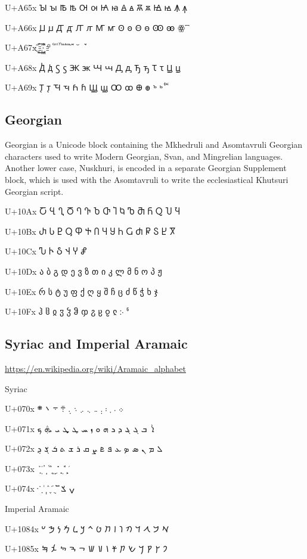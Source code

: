 U+A65x 	Ꙑ 	ꙑ 	Ꙓ 	ꙓ 	Ꙕ 	ꙕ 	Ꙗ 	ꙗ 	Ꙙ 	ꙙ 	Ꙛ 	ꙛ 	Ꙝ 	ꙝ 	Ꙟ 	ꙟ

U+A66x 	Ꙡ 	ꙡ 	Ꙣ 	ꙣ 	Ꙥ 	ꙥ 	Ꙧ 	ꙧ 	Ꙩ 	ꙩ 	Ꙫ 	ꙫ 	Ꙭ 	ꙭ 	ꙮ 	 ꙯

U+A67x 	 ꙰ 	 ꙱ 	 ꙲ 	꙳ 	 ꙴ 	 ꙵ 	 ꙶ 	 ꙷ 	 ꙸ 	 ꙹ 	 ꙺ 	 ꙻ 	 ꙼ 	 ꙽ 	꙾ 	ꙿ

U+A68x 	Ꚁ 	ꚁ 	Ꚃ 	ꚃ 	Ꚅ 	ꚅ 	Ꚇ 	ꚇ 	Ꚉ 	ꚉ 	Ꚋ 	ꚋ 	Ꚍ 	ꚍ 	Ꚏ 	ꚏ

U+A69x 	Ꚑ 	ꚑ 	Ꚓ 	ꚓ 	Ꚕ 	ꚕ 	Ꚗ 	ꚗ 	Ꚙ 	ꚙ 	Ꚛ 	ꚛ 	ꚜ 	ꚝ 	ꚞ 	ꚟ

\subsection{Georgian}
Georgian is a Unicode block containing the Mkhedruli and Asomtavruli Georgian characters used to write Modern Georgian, Svan, and Mingrelian languages. Another lower case, Nuskhuri, is encoded in a separate Georgian Supplement block, which is used with the Asomtavruli to write the ecclesiastical Khutsuri Georgian script.

U+10Ax 	Ⴀ 	Ⴁ 	Ⴂ 	Ⴃ 	Ⴄ 	Ⴅ 	Ⴆ 	Ⴇ 	Ⴈ 	Ⴉ 	Ⴊ 	Ⴋ 	Ⴌ 	Ⴍ 	Ⴎ 	Ⴏ

U+10Bx 	Ⴐ 	Ⴑ 	Ⴒ 	Ⴓ 	Ⴔ 	Ⴕ 	Ⴖ 	Ⴗ 	Ⴘ 	Ⴙ 	Ⴚ 	Ⴛ 	Ⴜ 	Ⴝ 	Ⴞ 	Ⴟ

U+10Cx 	Ⴠ 	Ⴡ 	Ⴢ 	Ⴣ 	Ⴤ 	Ⴥ

U+10Dx 	ა 	ბ 	გ 	დ 	ე 	ვ 	ზ 	თ 	ი 	კ 	ლ 	მ 	ნ 	ო 	პ 	ჟ

U+10Ex 	რ 	ს 	ტ 	უ 	ფ 	ქ 	ღ 	ყ 	შ 	ჩ 	ც 	ძ 	წ 	ჭ 	ხ 	ჯ

U+10Fx 	ჰ 	ჱ 	ჲ 	ჳ 	ჴ 	ჵ 	ჶ 	ჷ 	ჸ 	ჹ 	ჺ 	჻ 	ჼ

\subsection{Syriac and Imperial Aramaic}
\url{https://en.wikipedia.org/wiki/Aramaic_alphabet}

Syriac

U+070x 	܀ 	܁ 	܂ 	܃ 	܄ 	܅ 	܆ 	܇ 	܈ 	܉ 	܊ 	܋ 	܌ 	܍ 	

U+071x 	ܐ 	ܑ 	ܒ 	ܓ 	ܔ 	ܕ 	ܖ 	ܗ 	ܘ 	ܙ 	ܚ 	ܛ 	ܜ 	ܝ 	ܞ 	ܟ

U+072x 	ܠ 	ܡ 	ܢ 	ܣ 	ܤ 	ܥ 	ܦ 	ܧ 	ܨ 	ܩ 	ܪ 	ܫ 	ܬ 	ܭ 	ܮ 	ܯ

U+073x 	ܰ 	ܱ 	ܲ 	ܳ 	ܴ 	ܵ 	ܶ 	ܷ 	ܸ 	ܹ 	ܺ 	ܻ 	ܼ 	ܽ 	ܾ 	ܿ

U+074x 	݀ 	݁ 	݂ 	݃ 	݄ 	݅ 	݆ 	݇ 	݈ 	݉ 	݊ 			ݍ 	ݎ 	

Imperial Aramaic

U+1084x 	𐡀 	𐡁 	𐡂 	𐡃 	𐡄 	𐡅 	𐡆 	𐡇 	𐡈 	𐡉 	𐡊 	𐡋 	𐡌 	𐡍 	𐡎 	𐡏

U+1085x 	𐡐 	𐡑 	𐡒 	𐡓 	𐡔 	𐡕 		𐡗 	𐡘 	𐡙 	𐡚 	𐡛 	𐡜 	𐡝 	𐡞 	𐡟

